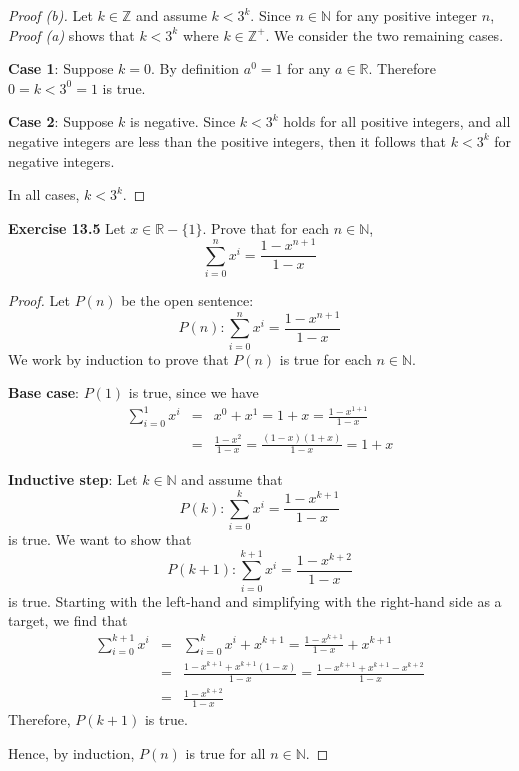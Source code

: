 \documentclass[12pt,oneside]{article}
\newenvironment{exercise}[1]{\vspace{.1in}\noindent\textbf{Exercise #1 \hspace{.05em}}}{}
\newcommand{\R}{\mathbb{R}}
\newcommand{\Z}{\mathbb{Z}}
\newcommand{\N}{\mathbb{N}}
\begin{document}
\begin{proof}[Proof (b)]
Let $k \in \Z$ and assume $k < 3^k$. Since $n \in \N$ for any positive integer $n$, \textit{Proof (a)} shows that $k < 3^k$ where $k \in \Z^+$. We consider the two remaining cases.

\textbf{Case 1}: Suppose $k = 0$. By definition $a^0 = 1$ for any $a \in \R$. Therefore $0 = k < 3^0 = 1$ is true.

\textbf{Case 2}: Suppose $k$ is negative. Since $k < 3^k$ holds for all positive integers, and all negative integers are less than the positive integers, then it follows that $k < 3^k$ for negative integers.

In all cases, $k < 3^k$.
\end{proof}



\begin{exercise}{13.5}
Let $x \in \R - \{1\}$. Prove that for each $n \in \N$,
\[\sum_{i = 0}^{n} x^i = \frac{1- x^{n + 1}}{1 - x}\]
\end{exercise}

\begin{proof}
Let $P(n)$ be the open sentence:
\[P(n): \sum_{i = 0}^{n} x^i = \frac{1- x^{n + 1}}{1 - x}\]
We work by induction to prove that $P(n)$ is true for each $n \in \N$.

\textbf{Base case}: $P(1)$ is true, since we have
\begin{eqnarray*}
\sum_{i = 0}^{1} x^i &=& x^0 + x^1 = 1 + x = \frac{1- x^{1 + 1}}{1 - x} \\
&=& \frac{1 - x^{2}}{1 - x} = \frac{(1 - x)(1 + x)}{1 - x} = 1 + x
\end{eqnarray*}

\textbf{Inductive step}: Let $k \in \N$ and assume that
\[P(k): \sum_{i = 0}^{k} x^i = \frac{1- x^{k + 1}}{1 - x}\]
is true. We want to show that
\[P(k + 1): \sum_{i = 0}^{k + 1} x^i = \frac{1- x^{k + 2}}{1 - x}\]
is true. Starting with the left-hand and simplifying with the right-hand side as a target, we find that
\begin{eqnarray*}
\sum_{i = 0}^{k + 1} x^i &=& \sum_{i = 0}^{k} x^i + x^{k+1} = \frac{1- x^{k + 1}}{1 - x} + x^{k+1}\\
&=& \frac{1 - x^{k+1} + x^{k+1}(1-x)}{1-x} = \frac{1 - x^{k+1} + x^{k+1}-x^{k+2}}{1-x} \\
&=& \frac{1 - x^{k+2}}{1-x}
\end{eqnarray*}
Therefore, $P(k+1)$ is true.

Hence, by induction, $P(n)$ is true for all $n \in \N$.
\end{proof}
\end{document}
